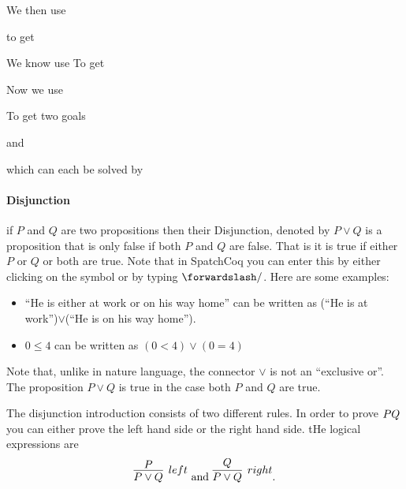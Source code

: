 We then use

to get

We know use
To get

Now we use 


To get two goals

and


which can each be solved by








\paragraph{\bf Disjunction}
 if $P$ and $Q$ are two propositions then their Disjunction, denoted by $P\lor Q$ is a proposition that is only false if both $P$ and $Q$ are false. That is it is true if either $P$ or $Q$ or both are true.  Note that in SpatchCoq you can enter this by either clicking on the symbol or by typing $\forwardslash/$. Here are some examples:

\begin{itemize}
\item ``He is either at work or on his way home'' can be written as (``He is  at work'')$\lor$(``He is on his way home'').
\item $0\le 4$ can be  written as $(0<4)\lor (0=4)$ 
\end{itemize}
Note that, unlike in nature language, the connector $\lor$ is not an ``exclusive or''. The proposition $P\lor Q$ is true in the case both $P$ and $Q$ are true.

The disjunction introduction consists of two different rules. In order to prove $P\/Q$ you can either prove the left hand side or the right hand side.  tHe logical expressions are
$$\infer[left]{P\lor Q}{P} \mbox{ and } \infer[right]{P\lor Q}{Q}.$$

